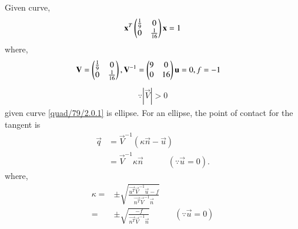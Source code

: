 
Given curve,
\begin{align}
\mathbf{x}^T\begin{pmatrix}\frac{1}{9} & 0 \\ 0 & \frac{1}{16}\end{pmatrix}\mathbf{x} = 1 \label{quad/79/2.0.1}
\end{align}
where,
\begin{align}
\mathbf{V}&=\begin{pmatrix}\frac{1}{9} & 0 \\ 0 & \frac{1}{16}\end{pmatrix},\mathbf{V}^{-1}=\begin{pmatrix}9&0\\0&16\end{pmatrix}\mathbf{u}=0, f = -1 
\end{align}
\begin{align}
\because |\vec{V}| > 0
\end{align}
given curve \eqref{quad/79/2.0.1} is ellipse.
For an ellipse, the point of contact for the tangent is
\begin{align}
\vec{q}&=\vec{V}^{-1}(\kappa\vec{n}-\vec{u})\\
&=\vec{V}^{-1}\kappa\vec{n}\quad\quad\quad(\because \vec{u}=0). \label{quad/79/2.0.5}
\end{align}
where,
\begin{align}
\kappa=&\pm \sqrt{\frac{\vec{u^T}\vec{V}^{-1}\vec{u}-f}{\vec{n^T}\vec{V}^{-1}\vec{n}}}\\
      =&\pm \sqrt{\frac{-f}{\vec{n^T}\vec{V}^{-1}\vec{n}}}\label{quad/79/2.0.7}\quad \quad\quad(\because \vec{u}=0)
\end{align}
